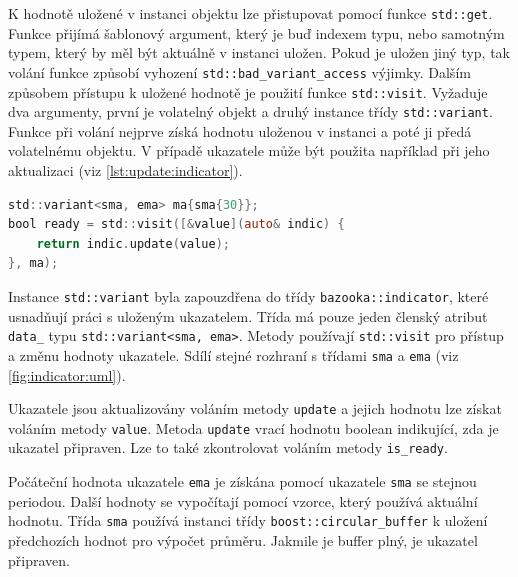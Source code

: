 K hodnotě uložené v instanci objektu lze přistupovat pomocí funkce \texttt{std::get}.
Funkce přijímá šablonový argument, který je buď indexem typu, nebo samotným typem, který by měl být aktuálně v instanci uložen.
Pokud je uložen jiný typ, tak volání funkce způsobí vyhození \texttt{std::bad\_variant\_access} výjimky.
Dalším způsobem přístupu k uložené hodnotě je použití funkce \texttt{std::visit}.
Vyžaduje dva argumenty, první je volatelný objekt a druhý instance třídy \texttt{std::variant}.
Funkce při volání nejprve získá hodnotu uloženou v instanci a poté ji předá volatelnému objektu.
V případě ukazatele může být použita například při jeho aktualizaci (viz \ref{lst:update:indicator}).

\begin{lstlisting}[caption={~Aktualizace indikátoru pomocí std::visit},label={lst:update:indicator},captionpos=t,abovecaptionskip=-\medskipamount,belowcaptionskip=\medskipamount,language=C]
std::variant<sma, ema> ma{sma{30}};
bool ready = std::visit([&value](auto& indic) {
    return indic.update(value);
}, ma);
\end{lstlisting}

Instance \texttt{std::variant} byla zapouzdřena do třídy \texttt{bazooka::indicator}, které usnadňují práci s uloženým ukazatelem.
Třída má pouze jeden členský atribut \texttt{data\_} typu \texttt{std::variant<sma, ema>}.
Metody používají \texttt{std::visit} pro přístup a změnu hodnoty ukazatele.
Sdílí stejné rozhraní s třídami \texttt{sma} a \texttt{ema} (viz \ref{fig:indicator:uml}).

Ukazatele jsou aktualizovány voláním metody \texttt{update} a jejich hodnotu lze získat voláním metody \texttt{value}.
Metoda \texttt{update} vrací hodnotu boolean indikující, zda je ukazatel připraven.
Lze to také zkontrolovat voláním metody \texttt{is\_ready}.

Počáteční hodnota ukazatele \texttt{ema} je získána pomocí ukazatele \texttt{sma} se stejnou periodou.
Další hodnoty se vypočítají pomocí vzorce, který používá aktuální hodnotu.
Třída \texttt{sma} používá instanci třídy \texttt{boost::circular\_buffer} k uložení předchozích hodnot pro výpočet průměru.
Jakmile je buffer plný, je ukazatel připraven.

